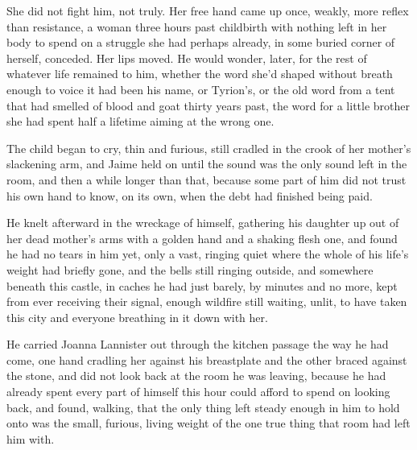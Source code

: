 She did not fight him, not truly. Her free hand came up once, weakly, more reflex than resistance, a woman three hours past childbirth with nothing left in her body to spend on a struggle she had perhaps already, in some buried corner of herself, conceded. Her lips moved. He would wonder, later, for the rest of whatever life remained to him, whether the word she’d shaped without breath enough to voice it had been his name, or Tyrion’s, or the old word from a tent that had smelled of blood and goat thirty years past, the word for a little brother she had spent half a lifetime aiming at the wrong one.

The child began to cry, thin and furious, still cradled in the crook of her mother’s slackening arm, and Jaime held on until the sound was the only sound left in the room, and then a while longer than that, because some part of him did not trust his own hand to know, on its own, when the debt had finished being paid.

\sceneBreak

He knelt afterward in the wreckage of himself, gathering his daughter up out of her dead mother’s arms with a golden hand and a shaking flesh one, and found he had no tears in him yet, only a vast, ringing quiet where the whole of his life’s weight had briefly gone, and the bells still ringing outside, and somewhere beneath this castle, in caches he had just barely, by minutes and no more, kept from ever receiving their signal, enough wildfire still waiting, unlit, to have taken this city and everyone breathing in it down with her.

He carried Joanna Lannister out through the kitchen passage the way he had come, one hand cradling her against his breastplate and the other braced against the stone, and did not look back at the room he was leaving, because he had already spent every part of himself this hour could afford to spend on looking back, and found, walking, that the only thing left steady enough in him to hold onto was the small, furious, living weight of the one true thing that room had left him with.